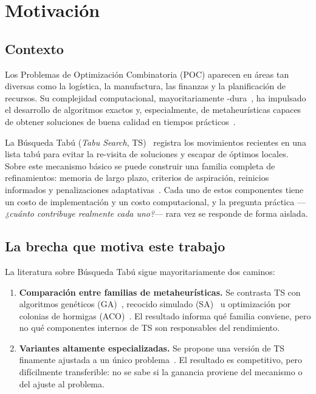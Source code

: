 \chapter{Motivación}
\label{cap:motivo}

\section{Contexto}

Los Problemas de Optimización Combinatoria (POC) aparecen en áreas tan
diversas como la logística, la manufactura, las finanzas y la planificación
de recursos. Su complejidad computacional, mayoritariamente
\NP-dura~\cite{garey1979computers,garey1976complexity}, ha impulsado el
desarrollo de algoritmos exactos y, especialmente, de metaheurísticas capaces
de obtener soluciones de buena calidad en tiempos
prácticos~\cite{gendreau2010handbook}.

La Búsqueda Tabú (\emph{Tabu Search}, TS)~\cite{glover1986future,glover1989tabu,glover1990tabu}
registra los movimientos recientes en una lista tabú para evitar la re-visita
de soluciones y escapar de óptimos locales. Sobre este mecanismo básico se
puede construir una familia completa de refinamientos: memoria de largo plazo,
criterios de aspiración, reinicios informados y penalizaciones
adaptativas~\cite{glover1997tabu}. Cada uno de estos componentes tiene un costo
de implementación y un costo computacional, y la pregunta práctica
—\emph{¿cuánto contribuye realmente cada uno?}— rara vez se responde de forma
aislada.

\section{La brecha que motiva este trabajo}

La literatura sobre Búsqueda Tabú sigue mayoritariamente dos caminos:

\begin{enumerate}
  \item \textbf{Comparación entre familias de metaheurísticas.} Se contrasta
    TS con algoritmos genéticos (GA)~\cite{holland1975adaptation}, recocido
    simulado (SA)~\cite{kirkpatrick1983optimization} u optimización por
    colonias de hormigas (ACO)~\cite{dorigo1996ant}. El resultado informa qué
    familia conviene, pero no qué componentes internos de TS son responsables
    del rendimiento.
  \item \textbf{Variantes altamente especializadas.} Se propone una versión de
    TS finamente ajustada a un único problema~\cite{cordeau2002guide}. El
    resultado es competitivo, pero difícilmente transferible: no se sabe si la
    ganancia proviene del mecanismo o del ajuste al problema.
\end{enumerate}

